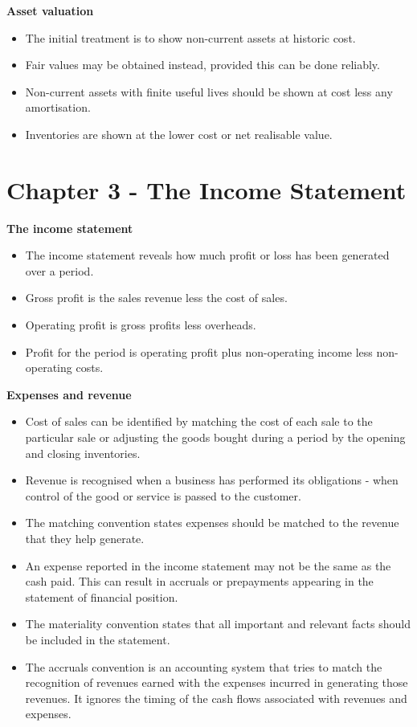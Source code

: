 \documentclass{report}
\begin{document}
\textbf{Asset valuation}
\begin{itemize}
    \item The initial treatment is to show non-current assets at historic cost.
    \item Fair values may be obtained instead, provided this can be done reliably.
    \item Non-current assets with finite useful lives should be shown at cost less any amortisation.
    \item Inventories are shown at the lower cost or net realisable value.
\end{itemize}

\section{Chapter 3 - The Income Statement}

\textbf{The income statement}
\begin{itemize}
    \item The income statement reveals how much profit or loss has been generated over a period.
    \item Gross profit is the sales revenue less the cost of sales.
    \item Operating profit is gross profits less overheads.
    \item Profit for the period is operating profit plus non-operating income less non-operating costs.\\
\end{itemize}

\textbf{Expenses and revenue}
\begin{itemize}
    \item Cost of sales can be identified by matching the cost of each sale to the particular sale or adjusting the goods bought during a period by the opening and closing inventories.
    \item Revenue is recognised when a business has performed its obligations - when control of the good or service is passed to the customer.
    \item The matching convention states expenses should be matched to the revenue that they help generate.
    \item An expense reported in the income statement may not be the same as the cash paid. This can result in accruals or prepayments appearing in the statement of financial position.
    \item The materiality convention states that all important and relevant facts should be included in the statement. 
    \item The accruals convention is an accounting system that tries to match the recognition of revenues earned with the expenses incurred in generating those revenues. It ignores the timing of the cash flows associated with revenues and expenses.\\
\end{itemize}
\end{document}

